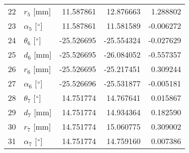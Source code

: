 \documentclass{standalone}%
\begin{document}
\begin{tabular}{llrrr}
22 &              $r_{5}$ [mm] &  11.587861 &  12.876663 &   1.288802 \\
23 &  $\alpha_{5}$ [$\degree$] &  11.587861 &  11.581589 &  -0.006272 \\
24 &  $\theta_{6}$ [$\degree$] & -25.526695 & -25.554324 &  -0.027629 \\
25 &              $d_{6}$ [mm] & -25.526695 & -26.084052 &  -0.557357 \\
26 &              $r_{6}$ [mm] & -25.526695 & -25.217451 &   0.309244 \\
27 &  $\alpha_{6}$ [$\degree$] & -25.526696 & -25.531877 &  -0.005181 \\
28 &  $\theta_{7}$ [$\degree$] &  14.751774 &  14.767641 &   0.015867 \\
29 &              $d_{7}$ [mm] &  14.751774 &  14.934364 &   0.182590 \\
30 &              $r_{7}$ [mm] &  14.751774 &  15.060775 &   0.309002 \\
31 &  $\alpha_{7}$ [$\degree$] &  14.751774 &  14.759160 &   0.007386 \\
\bottomrule
\end{tabular}
%
\end{document}
